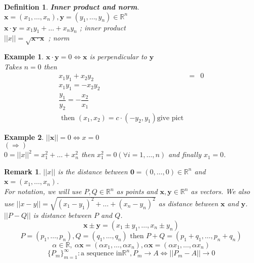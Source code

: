 \documentclass[a4paper,10pt]{article}
\newtheorem{remark}{Remark}[]
\newtheorem{defi}{Definition}[]
\newtheorem{ex}{Example}[]
\begin{document}
\begin{defi}
	\textbf{Inner product and norm}.\\
	$ \mathbf{x} = (x_{1}, \dots, x_{n}) , \mathbf{y} = (y_{1}, \dots, y_{n}  ) \in \mathbb{R}^n $\\
	$ \mathbf{x} \cdot \mathbf{y} = x_{1}y_{1} + \dots + x_{n}y_{n} $ ; inner product\\
	$ ||x|| = \sqrt{\mathbf{x} \cdot \mathbf{x}} $ ; norm
\end{defi}

\begin{ex}
	$ \mathbf{x} \cdot \mathbf{y} =0 \Leftrightarrow \mathbf{x} $ is perpendicular to $ \mathbf{y} $\\
	Takes $ n=0 $ then
	\begin{eqnarray} \nonumber
	x_{1}y_{1} + x_{2}y_{2} &=& 0 \\ \nonumber
	x_{1}y_{1} = -x_{2}y_{2} \\ \nonumber
	\dfrac{y_{1}}{y_{2}} = - \dfrac{x_{2}}{x_{1}}\\ \nonumber
	\text{ then } (x_{1},x_{2}) = c \cdot(-y_{2},y_{1})
	\text{give pict}
	\end{eqnarray}
\end{ex}

\begin{ex}
	$ ||\mathbf{x}||=0 \Leftrightarrow x=0$\\
	$ (\Rightarrow) $\\
	$ 0 = ||x||^2 = x_{1}^2 + \dots + x_{n}^2 $ then $ x_{1}^2 =0 (\forall i =1, \dots, n )$ and finally $ x_{1}=0 $.
\end{ex}

\begin{remark}
	$ ||x|| $ is the distance between $ \mathbf{0} = (0, \dots, 0) \in \mathbb{R}^n $ and $ \mathbf{x}= (x_{1}, \dots, x_{n}) $.\\
	For notation, we will use $ P,Q \in \mathbb{R}^n $ as points and $ \mathbf{x}, \mathbf{y} \in \mathbb{R}^n $ as vectors. We also use $ ||x-y|| = \sqrt{(x_{1}-y_{1})^2 + \dots + (x_{n}-y_{n})^2} $ as distance between $ \mathbf{x} $ and $ \mathbf{y} $.  $ ||P-Q|| $ is distance between $ P $ and $ Q $.
	\[ \mathbf{x} \pm \mathbf{y} = ( x_{1} \pm y_{1} , \dots, x_{n} \pm y_{n} ) \]
	\[ P=(p_{1}, \dots, p_{n}) ,  Q = (q_{1}, \dots, q_{n})  \text{ then } P+Q = (p_{1}+q_{1}, \dots, p_{n}+q_{n}) \]
	\[ \alpha \in \mathbb{R}, \ \alpha\mathbf{x} = (\alpha x_{1}, \dots, \alpha x_{n}),  \alpha\mathbf{x} = (\alpha x_{1}, \dots, \alpha x_{n})\]
	\[  \{P_{m}\}_{m=1}^{\infty} : \text{a sequence in} \mathbb{R}^n , P_{m} \rightarrow A \Leftrightarrow ||P_{m}-A|| \rightarrow 0 \]
\end{remark}
\end{document}
